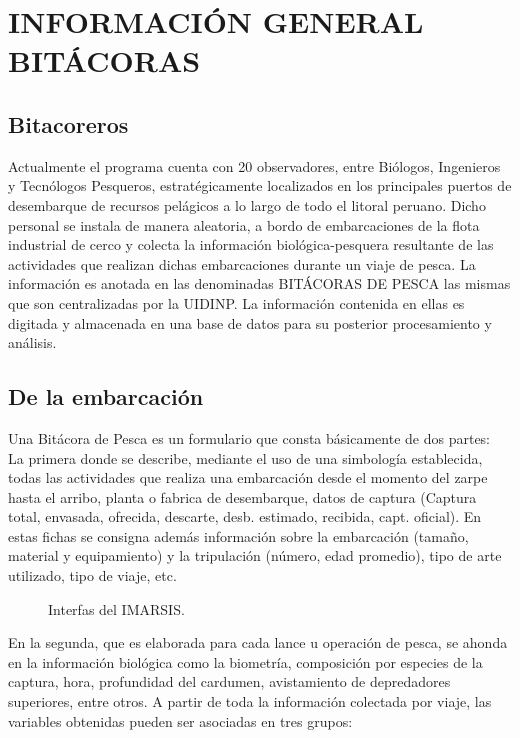 \documentclass[a4paper,oneside,11pt]{book}
\begin{document}
\chapter{INFORMACIÓN GENERAL BITÁCORAS}

\section{Bitacoreros}

Actualmente el programa cuenta con 20 observadores, entre Biólogos, Ingenieros y Tecnólogos Pesqueros, estratégicamente localizados en los principales puertos de desembarque de recursos pelágicos a lo largo de todo el litoral peruano.
Dicho personal se instala de manera aleatoria, a bordo de embarcaciones de la flota industrial de cerco y colecta la información  biológica-pesquera resultante de las actividades que realizan dichas embarcaciones durante un viaje de pesca.
La información es anotada en las denominadas BITÁCORAS DE PESCA las mismas que son centralizadas por la UIDINP. La información contenida en ellas es digitada y almacenada en una base de datos para su posterior procesamiento y análisis.


\section{De la embarcación} 
Una Bitácora de Pesca es un formulario que consta básicamente de dos partes:\\
La primera donde se describe, mediante el uso de una simbología establecida, todas las actividades que realiza una embarcación desde el momento del zarpe hasta el arribo, planta o fabrica de desembarque, datos de captura (Captura total, envasada, ofrecida, descarte, desb. estimado, recibida, capt. oficial). En estas fichas se consigna además información sobre la embarcación (tamaño, material y equipamiento) y la tripulación (número, edad promedio), tipo de arte utilizado, tipo de viaje, etc.

 \begin{figure}[!h]
  \begin{center} 
  \caption{Interfas del IMARSIS.}
 \end{center}
  \end{figure}

En la segunda, que es elaborada para cada lance u operación de pesca, se ahonda en la información biológica como la biometría, composición por especies de la captura, hora, profundidad del cardumen, avistamiento de depredadores superiores, entre otros.
A partir de toda la información colectada por viaje, las variables obtenidas pueden ser asociadas en tres grupos:
\end{document}
